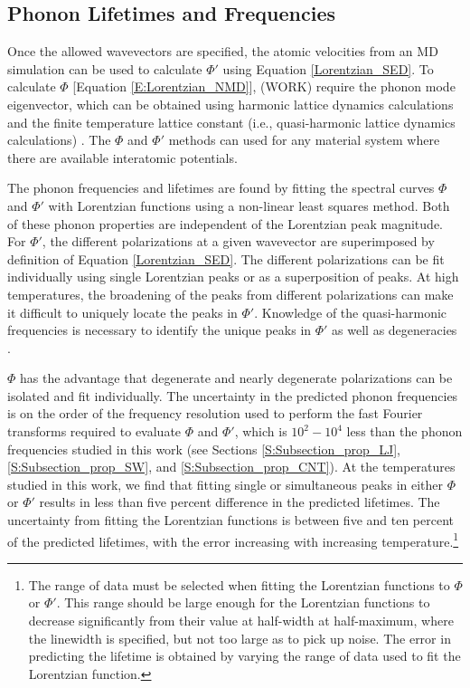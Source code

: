 \subsection{\label{Subsection_Comp_Details_2}Phonon Lifetimes and 
Frequencies}
Once the allowed wavevectors are specified, the atomic velocities from 
an MD simulation can 
be used to calculate $\Phi'$ using Equation \eqref{Lorentzian_SED}. To 
calculate $\Phi$ 
[Equation \eqref{E:Lorentzian_NMD}], (WORK) 
require the phonon mode eigenvector, which can be obtained using harmonic 
lattice dynamics calculations 
and the finite temperature lattice constant (i.e., quasi-harmonic lattice 
dynamics calculations) 
\cite{dove_introduction_1993}. The $\Phi$ and $\Phi'$ methods can used 
for any material system where there are 
available interatomic potentials.

The phonon frequencies and lifetimes are found by fitting the spectral 
curves $\Phi$ and 
$\Phi'$ with Lorentzian functions using a non-linear least squares method. 
Both of these 
phonon properties are independent of the Lorentzian peak magnitude. For 
$\Phi'$, the different 
polarizations at a given wavevector are superimposed by definition of 
Equation \eqref{Lorentzian_SED}. 
The different polarizations can be fit individually using single Lorentzian 
peaks or as a 
superposition of peaks. At high temperatures, the broadening of the peaks 
from different 
polarizations can make it difficult to uniquely locate the peaks in 
$\Phi'$. Knowledge of the 
quasi-harmonic frequencies is necessary to identify the unique peaks in 
$\Phi'$ as well as 
degeneracies \cite{mcgaughey_phonon_2006,turney_predicting_2009}.

$\Phi$ has the advantage that degenerate and nearly degenerate 
polarizations can be 
isolated and fit individually. The uncertainty in the predicted phonon 
frequencies is 
on the order of the frequency resolution used to perform the fast Fourier 
transforms 
required to evaluate $\Phi$ and $\Phi'$, which is $10^2-10^4$ less than 
the phonon frequencies 
studied in this work (see Sections \ref{S:Subsection_prop_LJ}, 
\ref{S:Subsection_prop_SW}, 
and \ref{S:Subsection_prop_CNT}). At the temperatures studied in this work, 
we find that 
fitting single or simultaneous peaks in either $\Phi$ or $\Phi'$ results 
in less than five 
percent difference in the predicted lifetimes. The uncertainty from 
fitting the Lorentzian 
functions is between five and ten percent of the predicted lifetimes, 
with the error increasing 
with increasing temperature.\footnote[1]{The range of data must be selected 
when fitting the 
Lorentzian functions to $\Phi$ or $\Phi'$. This range should be large 
enough for the Lorentzian 
functions to decrease significantly from their value at
half-width at half-maximum, where the linewidth is specified, but not 
too large as to pick up 
noise. The error in predicting the lifetime is obtained by varying the 
range of data
used to fit the Lorentzian function.}

